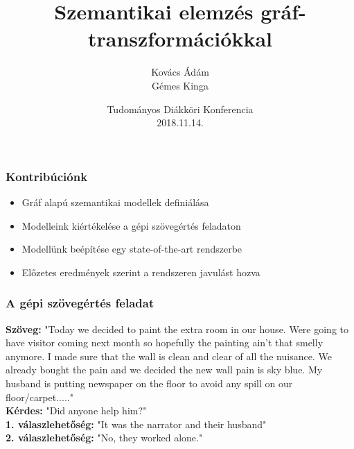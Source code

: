 \documentclass[bigger]{beamer}
\begin{document}
\title{Szemantikai elemz\'es gr\'af-transzform\'aci\'okkal}
\author{Kov\'acs \'Ad\'am \\ G\'emes Kinga}

\date{Tudományos Diákköri Konferencia\\2018.11.14.}


\begin{frame} 

\titlepage 

\end{frame} 


\begin{frame} 

    \frametitle{Kontribúciónk} 
    \begin{itemize}
        \pause \item Gráf alapú szemantikai modellek definiálása
        \pause \item Modelleink kiértékelése a gépi szövegértés feladaton
        \pause \item Modellünk beépítése egy state-of-the-art rendszerbe
        \pause \item Előzetes eredmények szerint a rendszeren javulást hozva
    \end{itemize}

\end{frame} 

\begin{frame}
	\frametitle{A gépi szövegértés feladat \citep{Chen:2018, Wang:2018}}
	\textbf{Sz\"oveg:} "Today we decided to paint the extra room in our house. Were going to have visitor coming next month so hopefully the painting ain't that smelly anymore. I made sure that the wall is clean and clear of all the nuisance. We already bought the pain and we decided the new wall pain is sky blue. My husband is putting newspaper on the floor to avoid any spill on our floor/carpet....." \\
	\textbf{K\'erdes:} "Did anyone help him?" \\
	\textbf{1. v\'alaszlehet\H{o}s\'eg:} "It was the narrator and their husband" \\
	\textbf{2. v\'alaszlehet\H{o}s\'eg:} "No, they worked alone."
\end{frame}

\end{document}
